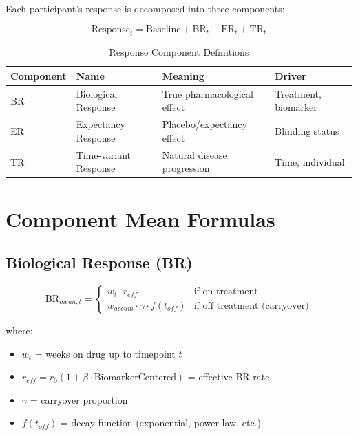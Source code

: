 \documentclass[11pt]{article}
\theoremstyle{definition}
\begin{document}
Each participant's response is decomposed into three components:

\begin{equation}
\text{Response}_t = \text{Baseline} + \text{BR}_t + \text{ER}_t + \text{TR}_t
\end{equation}

\begin{table}[h]
\centering
\caption{Response Component Definitions}
\begin{tabular}{@{}llll@{}}
\toprule
\textbf{Component} & \textbf{Name} & \textbf{Meaning} & \textbf{Driver} \\
\midrule
BR & Biological Response & True pharmacological effect & Treatment, biomarker \\
ER & Expectancy Response & Placebo/expectancy effect & Blinding status \\
TR & Time-variant Response & Natural disease progression & Time, individual \\
\bottomrule
\end{tabular}
\end{table}

\section{Component Mean Formulas}

\subsection{Biological Response (BR)}

\begin{equation}
\text{BR}_{mean,t} = \begin{cases}
w_t \cdot r_{eff} & \text{if on treatment} \\
w_{accum} \cdot \gamma \cdot f(t_{off}) & \text{if off treatment (carryover)}
\end{cases}
\end{equation}

where:
\begin{itemize}
    \item $w_t$ = weeks on drug up to timepoint $t$
    \item $r_{eff} = r_0 (1 + \beta \cdot \text{BiomarkerCentered})$ = effective BR rate
    \item $\gamma$ = carryover proportion
    \item $f(t_{off})$ = decay function (exponential, power law, etc.)
\end{itemize}
\end{document}
